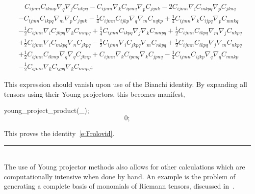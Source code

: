 \documentclass[11pt]{article}
\newenvironment{hanging}
    {\begin{list}{}{\setlength\itemsep{0pt}%
 \setlength\topsep{0pt}%
 \setlength\leftmargin{25pt}%
 \setlength\itemindent{0pt}%
 \setlength\listparindent{\itemindent}}%
     \item[]}
    {\end{list}}
\newcommand{\botrule}{\noindent\hspace{25pt}\rule{435pt}{.1pt}\\[2ex]}
\newenvironment{cdbcont}{\fvset{firstnumber=last}\color[named]{Blue}\Verbatim}{\endVerbatim}
\newenvironment{cdbout}{\vspace{-1.4ex}\begin{equation}}{\end{equation}\vspace{-1.4ex}}
\newenvironment{cdbcom}{\begin{hanging}}{\end{hanging}}
\begin{document}
\begin{cdbout}
\begin{aligned}
& ~~~~ C_{i j m n} C_{i k m p} \nabla_{q}{\nabla_{j}{C_{n k p q}}} 
- C_{i j m n} \nabla_{k}{C_{i p m q}} \nabla_{p}{C_{j q n k}} 
- 2 C_{i j m n} \nabla_{i}{C_{m k p q}} \nabla_{p}{C_{j k n q}} \\
&- C_{i j m n} C_{i k p q} \nabla_{m}{\nabla_{p}{C_{j q n k}}} 
- \frac{1}{4} C_{i j m n} C_{i j k p} \nabla_{q}{\nabla_{m}{C_{n q k p}}} 
+ \frac{1}{4} C_{i j m n} \nabla_{k}{C_{i j p q}} \nabla_{p}{C_{m n k q}} \\
&- \frac{1}{2} C_{i j m n} \nabla_{i}{C_{j k p q}} \nabla_{k}{C_{m n p q}} 
+ \frac{1}{4} C_{i j m n} C_{i k p q} \nabla_{j}{\nabla_{k}{C_{m n p q}}} 
+ \frac{1}{2} C_{i j m n} C_{i k p q} \nabla_{m}{\nabla_{j}{C_{n k p q}}} \\
&+ \frac{1}{2} C_{i j m n} \nabla_{i}{C_{m k p q}} \nabla_{n}{C_{j k p q}} 
- \frac{1}{2} C_{i j m n} \nabla_{i}{C_{j k p q}} \nabla_{m}{C_{n k p q}} 
+ \frac{1}{2} C_{i j m n} C_{i k p q} \nabla_{j}{\nabla_{m}{C_{n k p q}}}\\ 
&+ \frac{1}{2} C_{i j m n} C_{i k m p} \nabla_{q}{\nabla_{q}{C_{j k n p}}} 
+ C_{i j m n} \nabla_{k}{C_{i p m q}} \nabla_{k}{C_{j p n q}} 
- \frac{1}{4} C_{i j m n} C_{i j k p} \nabla_{q}{\nabla_{q}{C_{m n k p}}} \\
&- \frac{1}{2} C_{i j m n} \nabla_{k}{C_{i j p q}} \nabla_{k}{C_{m n p q}};
\end{aligned}
\end{cdbout}
\begin{cdbcom}
This expression should vanish upon use of the Bianchi identity. By
expanding all tensors using their Young projectors, this becomes manifest,
\end{cdbcom}
\begin{cdbcont}
young_project_product(_);
\end{cdbcont}
\begin{cdbout}
0;
\end{cdbout}
\begin{cdbcom}
This proves the identity~\eqref{e:Frolovid}.
\end{cdbcom}
\botrule
The use of Young projector methods also allows for other calculations
which are computationally intensive when done by hand. An example is
the problem of generating a complete basis of monomials of Riemann
tensors, discussed in~\cite{Peeters:2006kp}. 

\end{document}
